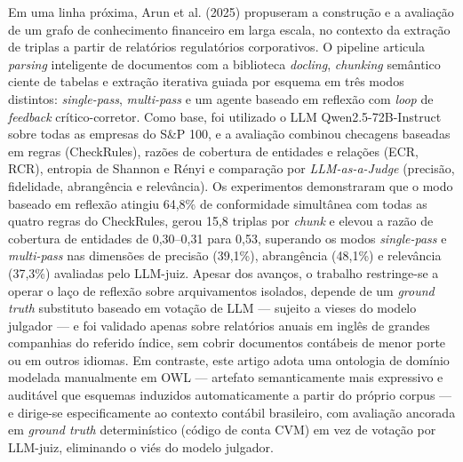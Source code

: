 \documentclass[12pt,a4paper]{article}
\begin{document}
Em uma linha próxima, Arun et al. (2025) propuseram a construção e a avaliação de um grafo de conhecimento financeiro em larga escala, no contexto da extração de triplas a partir de relatórios regulatórios corporativos. O pipeline articula \textit{parsing} inteligente de documentos com a biblioteca \textit{docling}, \textit{chunking} semântico ciente de tabelas e extração iterativa guiada por esquema em três modos distintos: \textit{single-pass}, \textit{multi-pass} e um agente baseado em reflexão com \textit{loop} de \textit{feedback} crítico-corretor. Como base, foi utilizado o LLM Qwen2.5-72B-Instruct sobre todas as empresas do S\&P 100, e a avaliação combinou checagens baseadas em regras (CheckRules), razões de cobertura de entidades e relações (ECR, RCR), entropia de Shannon e Rényi e comparação por \textit{LLM-as-a-Judge} (precisão, fidelidade, abrangência e relevância). Os experimentos demonstraram que o modo baseado em reflexão atingiu 64,8\% de conformidade simultânea com todas as quatro regras do CheckRules, gerou 15,8 triplas por \textit{chunk} e elevou a razão de cobertura de entidades de 0,30--0,31 para 0,53, superando os modos \textit{single-pass} e \textit{multi-pass} nas dimensões de precisão (39,1\%), abrangência (48,1\%) e relevância (37,3\%) avaliadas pelo LLM-juiz. Apesar dos avanços, o trabalho restringe-se a operar o laço de reflexão sobre arquivamentos isolados, depende de um \textit{ground truth} substituto baseado em votação de LLM --- sujeito a vieses do modelo julgador --- e foi validado apenas sobre relatórios anuais em inglês de grandes companhias do referido índice, sem cobrir documentos contábeis de menor porte ou em outros idiomas. Em contraste, este artigo adota uma ontologia de domínio modelada manualmente em OWL --- artefato semanticamente mais expressivo e auditável que esquemas induzidos automaticamente a partir do próprio corpus --- e dirige-se especificamente ao contexto contábil brasileiro, com avaliação ancorada em \textit{ground truth} determinístico (código de conta CVM) em vez de votação por LLM-juiz, eliminando o viés do modelo julgador.
\end{document}
